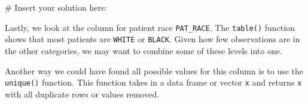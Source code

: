 \documentclass[
  letterpaper,
]{latex/krantz}
\makeatletter
\newenvironment{Shaded}{\begin{snugshade}}{\end{snugshade}}
\newcommand{\CommentTok}[1]{\textcolor[rgb]{0.37,0.37,0.37}{#1}}
\newcommand{\FunctionTok}[1]{\textcolor[rgb]{0.28,0.35,0.67}{#1}}
\newcommand{\NormalTok}[1]{\textcolor[rgb]{0.00,0.23,0.31}{#1}}
\newcommand{\SpecialCharTok}[1]{\textcolor[rgb]{0.37,0.37,0.37}{#1}}
\newenvironment{kframe}{%
\medskip{}
\setlength{\fboxsep}{.8em}
 \def\at@end@of@kframe{}%
 \ifinner\ifhmode%
  \def\at@end@of@kframe{\end{minipage}}%
  \begin{minipage}{\columnwidth}%
 \fi\fi%
 \def\FrameCommand##1{\hskip\@totalleftmargin \hskip-\fboxsep
 \colorbox{shadecolor}{##1}\hskip-\fboxsep
     \hskip-\linewidth \hskip-\@totalleftmargin \hskip\columnwidth}%
 \MakeFramed {\advance\hsize-\width
   \@totalleftmargin\z@ \linewidth\hsize
   \@setminipage}}%
 {\par\unskip\endMakeFramed%
 \at@end@of@kframe}
\renewenvironment{Shaded}{\begin{kframe}}{\end{kframe}}
\makeatother
\begin{document}
\begin{Shaded}
\begin{Highlighting}[]
\CommentTok{\# Insert your solution here:}
\end{Highlighting}
\end{Shaded}

Lastly, we look at the column for patient race \texttt{PAT\_RACE}. The
\texttt{table()} function shows that most patients are \texttt{WHITE} or
\texttt{BLACK}. Given how few observations are in the other categories,
we may want to combine some of these levels into one.

\begin{Shaded}
\end{Shaded}

Another way we could have found all possible values for this column is
to use the
\texttt{unique()}
function. This function takes in a data frame or vector \texttt{x} and
returns \texttt{x} with all duplicate rows or values removed.
\end{document}
